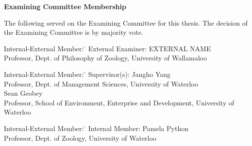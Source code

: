 \begin{center}\textbf{Examining Committee Membership}\end{center}
  \noindent
The following served on the Examining Committee for this thesis. The decision of the Examining Committee is by majority vote.
  \bigskip
  
  \noindent
\begin{tabbing}
Internal-External Member: \=  \kill %
External Examiner: \>  EXTERNAL NAME \\ 
\> Professor, Dept. of Philosophy of Zoology, University of Wallamaloo \\
\end{tabbing} 
  \bigskip
  
  \noindent
\begin{tabbing}
Internal-External Member: \=  \kill %
Supervisor(s): \> Jangho Yang \\
\> Professor, Dept. of Management Sciences, University of Waterloo \\
\> Sean Geobey \\
\> Professor, School of Environment, Enterprise and Development, University of Waterloo \\
\end{tabbing}
  \bigskip
  
  \noindent
  \begin{tabbing}
Internal-External Member: \=  \kill %
Internal Member: \> Pamela Python \\
\> Professor, Dept. of Zoology, University of Waterloo \\
\end{tabbing}
  \bigskip
  
  

